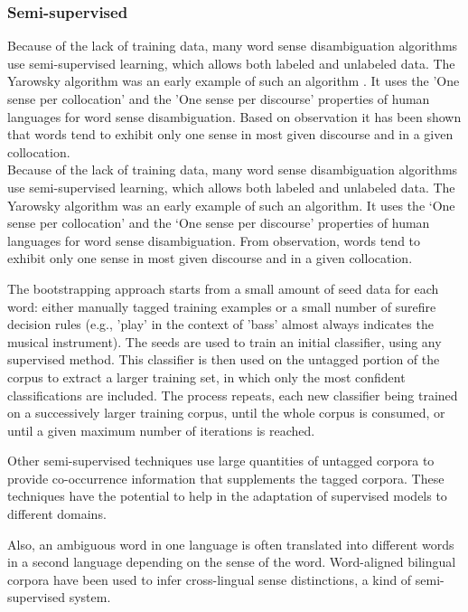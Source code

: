 \subsubsection*{Semi-supervised}

Because of the lack of training data, many word sense disambiguation algorithms use semi-supervised learning, which allows both labeled and unlabeled data. The Yarowsky algorithm was an early example of such an algorithm \cite{Gartner201317}. 
It uses the 'One sense per collocation' and the 'One sense per discourse' properties of human languages for word sense disambiguation. 
Based on observation it has been shown that words tend to exhibit only one sense in most given discourse and in a given collocation. \\

Because of the lack of training data, many word sense disambiguation algorithms use semi-supervised learning, which allows both labeled and unlabeled data. The Yarowsky algorithm was an early example of such an algorithm. 
It uses the ‘One sense per collocation’ and the ‘One sense per discourse’ properties of human languages for word sense disambiguation. 
From observation, words tend to exhibit only one sense in most given discourse and in a given collocation.

The bootstrapping approach starts from a small amount of seed data for each word: either manually tagged training examples or a small number of surefire decision rules (e.g., 'play' in the context of 'bass' almost always indicates the musical instrument). 
The seeds are used to train an initial classifier, using any supervised method. 
This classifier is then used on the untagged portion of the corpus to extract a larger training set, in which only the most confident classifications are included. 
The process repeats, each new classifier being trained on a successively larger training corpus, until the whole corpus is consumed, or until a given maximum number of iterations is reached.

Other semi-supervised techniques use large quantities of untagged corpora to provide co-occurrence information that supplements the tagged corpora. 
These techniques have the potential to help in the adaptation of supervised models to different domains.

Also, an ambiguous word in one language is often translated into different words in a second language depending on the sense of the word. Word-aligned bilingual corpora have been used to infer cross-lingual sense distinctions, a kind of semi-supervised system.


